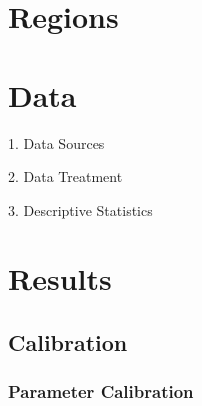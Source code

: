 \documentclass[
	12pt, 
	]{article}
\numberwithin{equation}{section}
\theoremstyle{definition}
\theoremstyle{plain}
\theoremstyle{plain}
\theoremstyle{plain}
\begin{document}
\newpage


\section{Regions}



\newpage


\section{Data}

\lipsum[1]

1. Data Sources

2. Data Treatment

3. Descriptive Statistics


\section{Results}

\lipsum[1]

\subsection{Calibration}


\subsubsection{Parameter Calibration}

\vspace*{-1cm}
\end{document}
